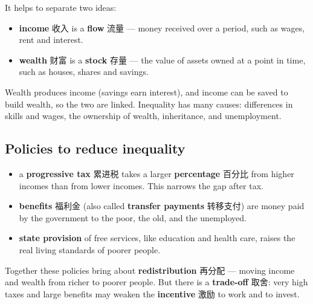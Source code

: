 \documentclass[11pt]{article}
\begin{document}
It helps to separate two ideas:

\begin{itemize}
\item \textbf{income} 收入 is a \textbf{flow} 流量 — money received over a period, such as wages, rent and interest.

\item \textbf{wealth} 财富 is a \textbf{stock} 存量 — the value of assets owned at a point in time, such as houses, shares and savings.

\end{itemize}

Wealth produces income (savings earn interest), and income can be saved to build wealth, so the two are linked. Inequality has many causes: differences in skills and wages, the ownership of wealth, inheritance, and unemployment.

\subsection*{Policies to reduce inequality}

\begin{itemize}
\item a \textbf{progressive tax} 累进税 takes a larger \textbf{percentage} 百分比 from higher incomes than from lower incomes. This narrows the gap after tax.

\item \textbf{benefits} 福利金 (also called \textbf{transfer payments} 转移支付) are money paid by the government to the poor, the old, and the unemployed.

\item \textbf{state provision} of free services, like education and health care, raises the real living standards of poorer people.

\end{itemize}

Together these policies bring about \textbf{redistribution} 再分配 — moving income and wealth from richer to poorer people. But there is a \textbf{trade-off} 取舍: very high taxes and large benefits may weaken the \textbf{incentive} 激励 to work and to invest.
\end{document}
